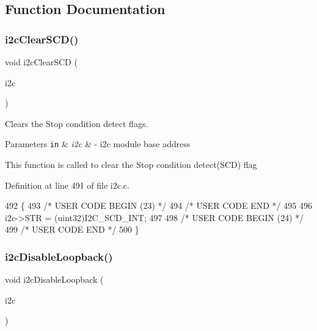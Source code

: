 \subsection{Function Documentation}
\mbox{\label{group__I2C_gaa381ceb41f9cae181b1e25f6094f5de0}} 
\subsubsection{\texorpdfstring{i2c\+Clear\+S\+C\+D()}{i2cClearSCD()}}
{\footnotesize\ttfamily void i2c\+Clear\+S\+CD (\begin{DoxyParamCaption}\item[{\mbox{\hyperlink{reg__i2c_8h_a5d6c119fb20e803a530d0d4df544daf7}{i2c\+B\+A\+S\+E\+\_\+t}} $\ast$}]{i2c }\end{DoxyParamCaption})}



Clears the Stop condition detect flags. 


\begin{DoxyParams}[1]{Parameters}
\mbox{\tt in}  & {\em i2c} & -\/ i2c module base address\\
\hline
\end{DoxyParams}
This function is called to clear the Stop condition detect(\+S\+C\+D) flag 

Definition at line 491 of file i2c.\+c.


\begin{DoxyCode}
492 \{
493 \textcolor{comment}{/* USER CODE BEGIN (23) */}
494 \textcolor{comment}{/* USER CODE END */}
495 
496     i2c->STR = (uint32)I2C\_SCD\_INT;
497 
498 \textcolor{comment}{/* USER CODE BEGIN (24) */}
499 \textcolor{comment}{/* USER CODE END */}
500 \}
\end{DoxyCode}
\mbox{\label{group__I2C_ga2c7b51e17f17e8cff5db50b18cf31bfa}} 
\subsubsection{\texorpdfstring{i2c\+Disable\+Loopback()}{i2cDisableLoopback()}}
{\footnotesize\ttfamily void i2c\+Disable\+Loopback (\begin{DoxyParamCaption}\item[{\mbox{\hyperlink{reg__i2c_8h_a5d6c119fb20e803a530d0d4df544daf7}{i2c\+B\+A\+S\+E\+\_\+t}} $\ast$}]{i2c }\end{DoxyParamCaption})}



